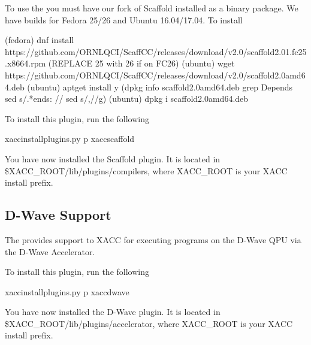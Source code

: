 \documentclass[letterpaper,10pt,english]{sphinxmanual}
\begin{document}
To use the  you must have our fork of
Scaffold installed as a binary package. We have builds for Fedora 25/26 and Ubuntu 16.04/17.04. To
install

\begin{sphinxVerbatim}[commandchars=\\\{\}]
\PYGZdl{} (fedora) dnf install https://github.com/ORNL\PYGZhy{}QCI/ScaffCC/releases/download/v2.0/scaffold\PYGZhy{}2.0\PYGZhy{}1.fc25.x86\PYGZus{}64.rpm (REPLACE 25 with 26 if on FC26)
\PYGZdl{} (ubuntu) wget https://github.com/ORNL\PYGZhy{}QCI/ScaffCC/releases/download/v2.0/scaffold\PYGZus{}2.0\PYGZus{}amd64.deb
\PYGZdl{} (ubuntu) apt\PYGZhy{}get install \PYGZhy{}y \PYGZdl{}(dpkg \PYGZhy{}\PYGZhy{}info scaffold\PYGZus{}2.0\PYGZus{}amd64.deb \textbar{} grep Depends \textbar{} sed \PYGZdq{}s/.*ends:\PYGZbs{} //\PYGZdq{} \textbar{} sed \PYGZsq{}s/,//g\PYGZsq{})
\PYGZdl{} (ubuntu) dpkg \PYGZhy{}i scaffold\PYGZus{}2.0\PYGZus{}amd64.deb
\end{sphinxVerbatim}

To install this plugin, run the following

\begin{sphinxVerbatim}[commandchars=\\\{\}]
\PYGZdl{} xacc\PYGZhy{}install\PYGZhy{}plugins.py \PYGZhy{}p xacc\PYGZhy{}scaffold
\end{sphinxVerbatim}

You have now installed the Scaffold plugin. It is located in \$XACC\_ROOT/lib/plugins/compilers,
where XACC\_ROOT is your XACC install prefix.


\subsection{D-Wave Support}
\label{\detokenize{install:d-wave-support}}
The  provides
support to XACC for executing programs
on the D-Wave QPU via the D-Wave Accelerator.

To install this plugin, run the following

\begin{sphinxVerbatim}[commandchars=\\\{\}]
\PYGZdl{} xacc\PYGZhy{}install\PYGZhy{}plugins.py \PYGZhy{}p xacc\PYGZhy{}dwave
\end{sphinxVerbatim}

You have now installed the D-Wave plugin. It is located in \$XACC\_ROOT/lib/plugins/accelerator,
where XACC\_ROOT is your XACC install prefix.
\end{document}
